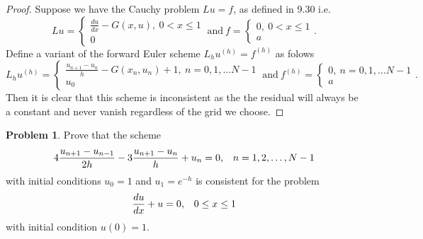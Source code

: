 \documentclass[12pt]{article}
\theoremstyle{definition}
\newtheorem{problem}{Problem}
\begin{document}
\begin{proof}
  Suppose we have the Cauchy problem $Lu = f$, as defined in 9.30 i.e.
  \[
      Lu =
      \begin{cases}
        \frac{du}{dx} - G(x, u),\ 0 < x \leq 1 \\
        0
      \end{cases}
      \ \text{and} \
      f =
      \begin{cases}
        0,\ 0 < x \leq 1 \\
        a
      \end{cases}.
  \]
  Define a variant of the forward Euler scheme $L_hu^{(h)} = f^{(h)}$ as folows
  \[
      L_hu^{(h)} =
      \begin{cases}
        \frac{u_{n+1} - u_{n}}{h} - G(x_n, u_n) + 1,\  n = 0, 1, \dots N-1 \\
        u_0
      \end{cases}
      \ \text{and} \
      f^{(h)} =
      \begin{cases}
        0,\  n = 0, 1, \dots N-1 \\
        a
      \end{cases}.
  \]
  Then it is clear that this scheme is inconsistent as the the residual will always
  be a constant and never vanish regardless of the grid we choose.
\end{proof}


\begin{problem}
  Prove that the scheme
  \[
    4 \frac{u_{n+1} - u_{n-1}}{2h} - 3 \frac{u_{n+1} - u_n}{h} + u_n = 0\text{,\quad $n = 1, 2, \dots, N-1$}
  \]
  with initial conditions $u_0 = 1$ and $u_1 = e^{-h}$ is consistent for the problem
  \[
    \frac{du}{dx} + u = 0\text{,\quad $0 \leq x \leq 1$}
  \]
  with initial condition $u(0) = 1$.
\end{problem}
\end{document}
